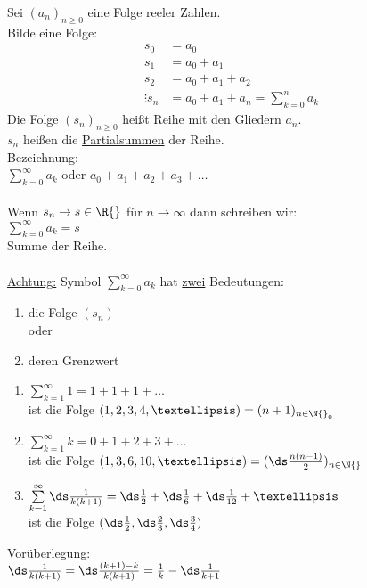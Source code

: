 Sei $(a_n)_{n \geq 0}$ eine Folge reeler Zahlen.\\
Bilde eine Folge:
\begin{align*}
s_0 &= a_0\\
s_1 &= a_0 + a_1\\
s_2 &= a_0 + a_1 + a_2\\
\vdots
s_n &= a_0 + a_1 + a_n = \sum\limits_{k = 0}^{n} a_k
\end{align*}
Die Folge $(s_n)_{n \geq 0}$ heißt Reihe mit den Gliedern $a_n$.\\
$s_n$ heißen die \underline{Partialsummen} der Reihe.\\
Bezeichnung:\\
$\sum\limits_{k = 0}^{\infty} a_k$ oder $a_0 + a_1 + a_2 + a_3 + …$\\ \\
Wenn $s_n \to s \in \R{}$ für $n \to \infty$ dann schreiben wir:\\
$\sum\limits_{k = 0}^{\infty} a_k = s$\\
Summe der Reihe.\\
\\
\underline{Achtung:} Symbol $\sum\limits_{k = 0}^{\infty} a_k$ hat \underline{zwei} Bedeutungen:
\begin{enumerate}
\item{die Folge $(s_n)$} \\
oder 
\item{deren Grenzwert}
\end{enumerate}
\bsp
\begin{enumerate}
\item{$\sum\limits_{k = 1}^{\infty} 1 = 1+1+1+…$\\
ist die Folge $(1, 2, 3, 4,…) = (n + 1)_{n \in \N{}_{0}}$}
\item{$\sum\limits_{k = 1}^{\infty} k = 0 + 1 + 2 + 3+ …$ \\
ist die Folge $(1, 3, 6, 10,…) = (\ds\frac{n(n - 1)}{2})_{n \in \N{}}$ }
\item{$\sum\limits_{k = 1}^{\infty} \ds\frac{1}{k(k+1)} = \ds\frac{1}{2} + \ds\frac{1}{6} + \ds\frac{1}{12} + …$\\
ist die Folge $(\ds\frac{1}{2}, \ds\frac{2}{3}, \ds\frac{3}{4})$}
\end{enumerate}
\vspace{5mm}
Vorüberlegung:\\
$\ds\frac{1}{k(k+1)} = \ds\frac{(k+1) - k}{k(k+1)} = \frac{1}{k} - \ds\frac{1}{k + 1}$\\ \\
